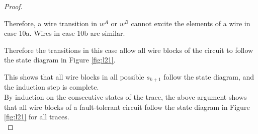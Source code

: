 \documentclass[12pt]{report}
\begin{document}
\begin{proof}
\begin{itemize}
\begin{itemize}
 Therefore, a wire transition in $w^A$ or $w^B$ cannot excite the elements of a wire in case 10a.  Wires in case 10b are similar.
\end{itemize}
Therefore the transitions in this case allow all wire blocks of the circuit to follow the state diagram in Figure \ref{fig:l21}.\\


\end{itemize}
This shows that all wire blocks in all possible $s_{k+1}$ follow the state diagram, and the induction step is complete.\\
By induction on the consecutive states of the trace, the above argument shows that all wire blocks of a fault-tolerant circuit follow the state diagram in Figure \ref{fig:l21} for all traces. \\
\end{proof}
\end{document}
